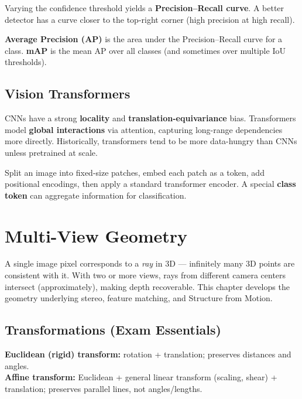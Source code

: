 \documentclass[11pt, oneside]{book}
\begin{document}
Varying the confidence threshold yields a \textbf{Precision--Recall curve}.
A better detector has a curve closer to the top-right corner (high precision at high recall).

\begin{defbox}[title={AP and mAP}]
\textbf{Average Precision (AP)} is the area under the Precision--Recall curve for a class.
\textbf{mAP} is the mean AP over all classes (and sometimes over multiple IoU thresholds).
\end{defbox}

\section{Vision Transformers}

CNNs have a strong \textbf{locality} and \textbf{translation-equivariance} bias.
Transformers model \textbf{global interactions} via attention, capturing long-range dependencies more directly.
Historically, transformers tend to be more data-hungry than CNNs unless pretrained at scale.

\begin{defbox}[title={Vision Transformer (ViT)}]
Split an image into fixed-size patches, embed each patch as a token, add positional encodings,
then apply a standard transformer encoder. A special \textbf{class token} can aggregate information for classification.
\end{defbox}


\chapter{Multi-View Geometry}

A single image pixel corresponds to a \emph{ray} in 3D --- infinitely many 3D points are consistent with it.
With two or more views, rays from different camera centers intersect (approximately), making depth recoverable.
This chapter develops the geometry underlying stereo, feature matching, and Structure from Motion.

\section{Transformations (Exam Essentials)}

\begin{notebox}[title={Key Transforms}]
\textbf{Euclidean (rigid) transform:} rotation + translation; preserves distances and angles.\\
\textbf{Affine transform:} Euclidean + general linear transform (scaling, shear) + translation; preserves parallel lines, not angles/lengths.
\end{notebox}
\end{document}

